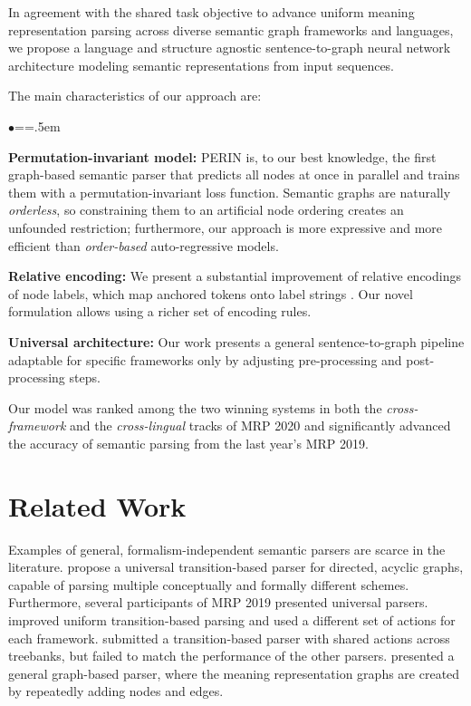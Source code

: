 \documentclass[11pt,a4paper]{article}
\newenvironment{citemize}{\begin{list}{$\bullet$}{\topsep=\smallskipamount\itemsep=1pt\parsep=1pt\labelwidth=.5em}}{\end{list}}
\begin{document}
In agreement with the shared task objective to advance uniform meaning representation parsing across diverse semantic graph frameworks and languages, we propose a language and structure agnostic sentence-to-graph neural network architecture modeling semantic representations from input sequences.

The main characteristics of our approach are:

\begin{citemize}
  \item \textbf{Permutation-invariant model:} PERIN is, to our best
  knowledge, the first graph-based semantic parser that predicts all nodes at once in parallel and trains them with a permutation-invariant loss function. Semantic graphs are naturally \emph{orderless}, so constraining them to an artificial node ordering creates an unfounded restriction; furthermore, our approach is more expressive and more efficient than \emph{order-based} auto-regressive models.
  \item \textbf{Relative encoding:} We present a substantial improvement of relative encodings of node labels, which map anchored tokens onto label strings \cite{Str:Str:19}. Our novel formulation allows using a richer set of encoding rules.
  \item \textbf{Universal architecture:} Our work presents a general sentence-to-graph pipeline adaptable for specific frameworks only by adjusting pre-processing and post-processing steps.
\end{citemize}

\noindent
Our model was ranked among the two winning systems in both the \emph{cross-framework} and the \emph{cross-lingual} tracks of MRP 2020 and significantly advanced the accuracy of semantic parsing from the last year's MRP 2019.
 \section{Related Work}

Examples of general, formalism-independent semantic parsers are scarce in the literature. \citet{hershcovich2018multitask} propose a universal transition-based parser for directed, acyclic graphs, capable of parsing multiple conceptually and formally different schemes. Furthermore, several participants of MRP 2019 presented universal parsers. \citet{Che:Dou:Xu:19} improved uniform transition-based parsing and used a different set of actions for each framework. \citet{Lai:Lo:Leu:19} submitted a transition-based parser with shared actions across treebanks, but failed to match the performance of the other parsers. \citet{Str:Str:19} presented a general graph-based parser, where the meaning representation graphs are created by repeatedly adding nodes and edges.
\end{document}
